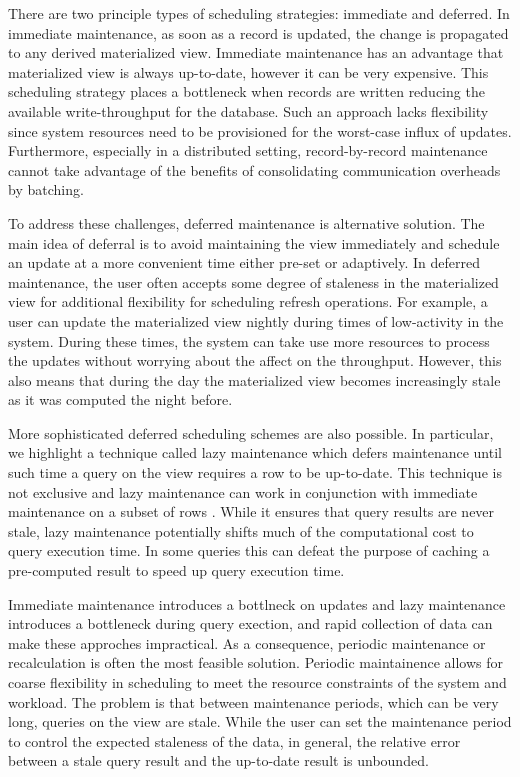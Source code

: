 There are two principle types of scheduling strategies: immediate and deferred. 
In immediate maintenance, as soon as a record is updated, 
the change is propagated to any derived materialized view.
Immediate maintenance has an advantage that materialized view is always up-to-date, 
however it can be very expensive.
This scheduling strategy places a bottleneck when records are written reducing 
the available write-throughput for the database.
Such an approach lacks flexibility since system resources need to be provisioned 
for the worst-case influx of updates.
Furthermore, especially in a distributed setting, record-by-record 
maintenance cannot take advantage of the benefits of consolidating communication overheads by batching.

To address these challenges, deferred maintenance is alternative solution.
The main idea of deferral is to avoid maintaining the view immediately and schedule an update at a more convenient time either pre-set or adaptively.
In deferred maintenance, the user often accepts some degree of staleness in 
the materialized view for additional flexibility for scheduling refresh operations.
For example, a user can update the materialized view nightly during times of low-activity in the system.
During these times, the system can take use more resources to process the updates without worrying about the affect on the throughput.
However, this also means that during the day the materialized view becomes increasingly stale as it was computed the night before.

More sophisticated deferred scheduling schemes are also possible.
In particular, we highlight a technique called lazy maintenance which defers maintenance until such time
a query on the view requires a row to be up-to-date.
This technique is not exclusive and lazy maintenance can work in conjunction with immediate maintenance on a subset of rows \cite{zhou2007lazy}.
While it ensures that query results are never stale, lazy maintenance potentially shifts much of the computational cost to query execution time.
In some queries this can defeat the purpose of caching a pre-computed result to speed up query execution time.

Immediate maintenance introduces a bottlneck on updates and lazy maintenance introduces a bottleneck during query exection,
and rapid collection of data can make these approches impractical.
As a consequence, periodic maintenance or recalculation is often the most feasible solution.
Periodic maintainence allows for coarse flexibility in scheduling to meet the resource constraints of the system and workload.
The problem is that between maintenance periods, which can be very long, queries on the view are stale.
While the user can set the maintenance period to control the expected staleness of the data, in general, the relative error between a stale query result and the up-to-date result is unbounded.

